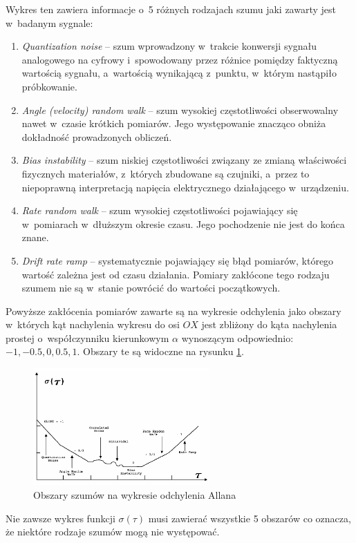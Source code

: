Wykres ten zawiera informacje o~5 różnych rodzajach szumu jaki zawarty jest w~badanym sygnale:

\begin{enumerate}
	\item {\emph{Quantization noise} -- szum wprowadzony w~trakcie konwersji sygnału analogowego na cyfrowy i~spowodowany przez różnice pomiędzy faktyczną wartością sygnału, a~wartością wynikającą z~punktu, w~którym nastąpiło próbkowanie.}
	\item {\emph{Angle (velocity) random walk} -- szum wysokiej częstotliwości obserwowalny nawet w~czasie krótkich pomiarów. Jego występowanie znacząco obniża dokładność prowadzonych obliczeń.}
	\item {\emph{Bias instability} -- szum niskiej częstotliwości związany ze zmianą właściwości fizycznych materiałów, z~których zbudowane są czujniki, a~przez to niepoprawną interpretacją napięcia elektrycznego działającego w~urządzeniu.}
	\item {\emph{Rate random walk} -- szum wysokiej częstotliwości pojawiający się w~pomiarach w~dłuższym okresie czasu. Jego pochodzenie nie jest do końca znane.}
    \item {\emph{Drift rate ramp} -- systematycznie pojawiający się błąd pomiarów, którego wartość zależna jest od czasu działania. Pomiary zakłócone tego rodzaju szumem nie są w~stanie powrócić do wartości początkowych.}	
\end{enumerate}

Powyższe zakłócenia pomiarów zawarte są na wykresie odchylenia jako obszary w~których kąt nachylenia wykresu do osi $OX$ jest zbliżony do kąta nachylenia prostej o~współczynniku kierunkowym $\alpha$ wynoszącym odpowiednio: $-1, -0.5, 0, 0.5 , 1$. Obszary te są widoczne na rysunku \ref{fig:appx:allan:slopes}.
\begin{figure}
	\centering
	\includegraphics[width=0.6\textwidth]{images/slopes.png}
	\caption{Obszary szumów na wykresie odchylenia Allana \cite{FreescaleSemiconductor2015}}
	\label{fig:appx:allan:slopes}
\end{figure}

Nie zawsze wykres funkcji $\sigma(\tau)$ musi zawierać wszystkie 5 obszarów co oznacza, że niektóre rodzaje szumów mogą nie występować.


